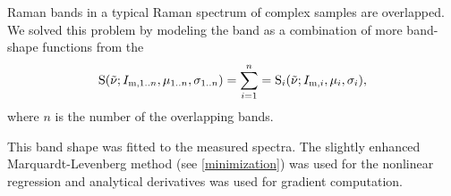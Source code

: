 Raman bands in a typical Raman spectrum of complex samples are overlapped. We
solved this problem by modeling the band as a combination of more band-shape
functions from the
\begin{equation}
	\func{S}(\wn; I_{\text{m},1..n}, \mu_{1..n}, \sigma_{1..n}) =
		\sum_{i = 1}^n = 	\func{S}_i(\wn; I_{\text{m},i}, \mu_i, \sigma_i),
	\label{\eqnlabel{band_intensities:shape}}
\end{equation}
where $n$ is the number of the overlapping bands.

This band shape was fitted to the measured spectra. The slightly enhanced
Marquardt-Levenberg method
(see \cref{minimization})
was used for the nonlinear regression and
analytical derivatives was used for gradient computation.
